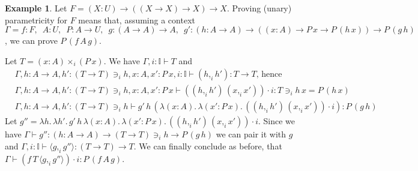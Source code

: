 \documentclass[english]{PaperTools/latex/entcs}
\theoremstyle{plain}
\theoremstyle{definition}
\newtheorem{example}[theorem]{Example}
\theoremstyle{remark}
\newcommand\CP[3]{(#2,_{#1} #3)}
\newcommand\CTimes[2]{(#2) ×_{#1}}
\newcommand\param[1]{\!\cdot\!#1}
\newcommand\op[1]{∋_{#1}}
\newcommand\fp[3]{⟨#2 ,_{#1} #3⟩}
\begin{document}
\begin{example}
  Let $F = (X : U) → ((X → X) → X) → X$.
  Proving (unary) parametricity for $F$ means that, assuming a context
    $Γ = f : F,\enspace
    A : U,\enspace
    P : A → U,\enspace
    g : (A → A) → A,\enspace
    g' : (h : A → A) → ((x : A) → P\, x → P\, (h\, x)) → P\, (g\, h)$,
  we can prove $P\, (f\, A\, g)$.

  Let $T = \CTimes i {x:A} {(P\,x)}$.
  We have $Γ, i:𝕀 ⊢ T$ and
  \begin{align*}
    \!\!\!&Γ, h:A → A, h': (T → T) \op i h, x : A, x' : P\, x, i:𝕀 ⊢ \CP i h {h'} : T → T\text{, hence}
    \\
    \!\!\!&Γ, h:A → A, h': (T → T) \op i h, x : A, x' : P\, x ⊢ (\CP i h {h'}\, \CP i x {x'}) \param i : T \op i h\, x = P\, (h\, x)
    \\
    \!\!\!&Γ, h:A → A, h': (T → T) \op i h ⊢ g'\, h\, (λ (x : A).\, λ (x' : P\, x).\, (\CP i h {h'}\, \CP i x {x'}) \param i) : P\, (g\, h)
  \end{align*}
  Let $g'' = λ h.\, λ h'.\, g'\, h\, λ (x : A).\, λ (x' : P\, x).\, (\CP i h {h'}\, \CP i x {x'}) \param i$.
  Since we have $Γ ⊢ g'' : (h:A → A) → (T → T) \op i h → P\, (g\, h)$
  we can pair it with $g$ and
  $Γ, i:𝕀 ⊢ \fp i g {g''} : (T → T) → T$. We can finally conclude as before, that
  $Γ ⊢ (f\, T\, \fp i g {g''}) \param i : P\, (f\, A\, g)$.
\end{example}
\end{document}
